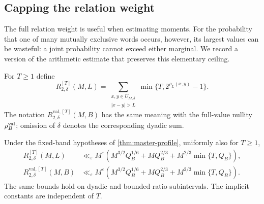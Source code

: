 \subsection{Capping the relation weight}\label{sec:capped-relations}
The full relation weight is useful when estimating moments. For the
probability that one of many mutually exclusive words occurs, however,
its largest values can be wasteful: a joint probability cannot exceed
either marginal. We record a version of the arithmetic estimate that
preserves this elementary ceiling.

For $T\ge1$ define
\[
 R_{2,\delta}^{[T]}(M,L)
   =\sum_{\substack{x,y\in U_{M,\delta}\\|x-y|>L}}
                         \min\{T,2^{\rho_L(x,y)}-1\}.
\]
The notation $R_{2,\delta}^{\mathrm{val},[T]}(M,B)$ has the same meaning
with the full-value nullity $\rho_B^{\rm val}$; omission of $\delta$
denotes the corresponding dyadic sum.
\begin{proposition}\label{prop:capped-profile}
Under the fixed-band hypotheses of \cref{thm:master-profile}, uniformly
also for $T\ge1$,
\begin{align}
 R_{2,\delta}^{[T]}(M,L)
 &\ll_\varepsilon M^\varepsilon
 \left(M^{3/2}Q_B^{1/6}+MQ_B^{2/3}
                    +M^{2/3}\min\{T,Q_B\}\right),
       \label{eq:capped-profile}\\
 R_{2,\delta}^{\mathrm{val},[T]}(M,B)
 &\ll_\varepsilon M^\varepsilon
 \left(M^{3/2}Q_B^{1/6}+MQ_B^{2/3}
                    +M^{2/3}\min\{T,Q_B\}\right).
       \label{eq:capped-value-profile}
\end{align}
The same bounds hold on dyadic and bounded-ratio subintervals. The
implicit constants are independent of $T$.
\end{proposition}
